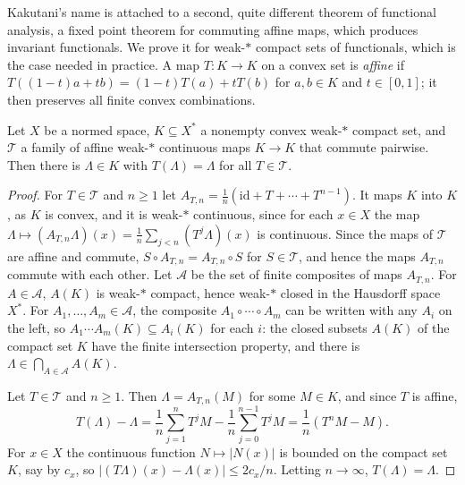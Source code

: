 Kakutani's name is attached to a second, quite different theorem of functional analysis, a fixed point theorem for commuting affine maps, which produces invariant functionals. We prove it for
weak-$*$ compact sets of functionals, which is the case needed in practice. A map $T \colon K \to K$ on a convex set is \emph{affine} if $T((1 - t)a + tb) = (1 - t)T(a) + tT(b)$ for $a, b \in K$ and
$t \in [0, 1]$; it then preserves all finite convex combinations.

\begin{theorem}\label{functional-analysis:theorem-markov-kakutani}
Let $X$ be a normed space, $K \subseteq X^*$ a nonempty convex weak-$*$ compact set, and $\mathcal{T}$ a family of affine weak-$*$ continuous maps $K \to K$ that commute pairwise. Then there is $\Lambda \in K$ with
$T(\Lambda) = \Lambda$ for all $T \in \mathcal{T}$.
\end{theorem}

\begin{proof}
For $T \in \mathcal{T}$ and $n \geq 1$ let $A_{T,n} = \frac1n(\mathrm{id} + T + \cdots + T^{n-1})$. It maps $K$ into $K$, as $K$ is convex, and it is weak-$*$ continuous, since for each $x \in X$ the map
$\Lambda \mapsto (A_{T,n}\Lambda)(x) = \frac1n\sum_{j<n}(T^j\Lambda)(x)$ is continuous. Since the maps of $\mathcal{T}$ are affine and commute, $S \circ A_{T,n} = A_{T,n} \circ S$ for $S \in \mathcal{T}$, and hence the
maps $A_{T,n}$ commute with each other. Let $\mathcal{A}$ be the set of finite composites of maps $A_{T,n}$. For $A \in \mathcal{A}$, $A(K)$ is weak-$*$ compact, hence weak-$*$ closed in the Hausdorff space
$X^*$. For $A_1, \ldots, A_m \in \mathcal{A}$, the composite $A_1 \circ \cdots \circ A_m$ can be written with any $A_i$ on the left, so $A_1 \cdots A_m(K) \subseteq A_i(K)$ for each $i$: the closed subsets $A(K)$
of the compact set $K$ have the finite intersection property, and there is $\Lambda \in \bigcap_{A \in \mathcal{A}}A(K)$.

Let $T \in \mathcal{T}$ and $n \geq 1$. Then $\Lambda = A_{T,n}(M)$ for some $M \in K$, and since $T$ is affine,
\[
T(\Lambda) - \Lambda = \frac1n\sum_{j=1}^{n}T^jM - \frac1n\sum_{j=0}^{n-1}T^jM = \frac1n(T^nM - M).
\]
For $x \in X$ the continuous function $N \mapsto |N(x)|$ is bounded on the compact set $K$, say by $c_x$, so $|(T\Lambda)(x) - \Lambda(x)| \leq 2c_x/n$. Letting $n \to \infty$, $T(\Lambda) = \Lambda$.
\end{proof}

